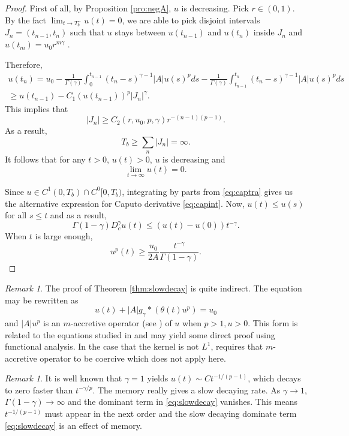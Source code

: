 \documentclass[12pt]{amsart}%
\theoremstyle{definition}
\theoremstyle{remark}
\newtheorem{rmk}[thm]{Remark}
\renewcommand{\ge}{\geqslant}
\renewcommand{\le}{\leqslant}
\begin{document}
\begin{proof}
First of all, by Proposition \ref{pro:negA}, $u$ is decreasing. Pick $r\in (0,1)$. 
 By the fact $\lim_{t\to T_b^-}u(t)=0$, we are able to pick disjoint intervals $J_n=(t_{n-1}, t_n)$ such that $u$ stays between $u(t_{n-1})$ and $u(t_n)$ inside $J_n$ and $u(t_m)=u_0r^{m\gamma}$ . 
 
Therefore, 
\begin{multline*}
u(t_n)=u_0-\frac{1}{\Gamma(\gamma)}\int_0^{t_{n-1}}(t_n-s)^{\gamma-1}|A|u(s)^pds-\frac{1}{\Gamma(\gamma)}\int_{t_{n-1}}^{t_n}
(t_n-s)^{\gamma-1}|A|u(s)^pds\\
\ge u(t_{n-1})-C_1(u(t_{n-1}))^p |J_n|^{\gamma}.
\end{multline*}
This implies that \[
|J_n|\ge C_2(r, u_0, p,\gamma) r^{-(n-1)(p-1)}.
\]
As a result, \[
T_b\ge \sum_{n} |J_n|=\infty.
\]
It follows that for any $t>0$, $u(t)>0$, $u$ is decreasing and \[
\lim_{t\to\infty}u(t)=0.
\]

Since $u\in C^1(0, T_b)\cap C^0[0, T_b)$,  integrating by parts from \eqref{eq:captra} gives us the alternative expression for Caputo derivative \eqref{eq:capint}. Now, $u(t)\le u(s)$ for all $s\le t$ and as a result,
 \[
\Gamma(1-\gamma)D_c^{\gamma}u(t) \le (u(t)-u(0))t^{-\gamma}.
\]
When $t$ is large enough,
\[
u^p(t)\ge \frac{u_0}{2A}\frac{t^{-\gamma}}{\Gamma(1-\gamma)}.
\]
\end{proof}

\begin{rmk}
The proof of Theorem \ref{thm:slowdecay} is quite indirect.  The equation may be rewritten as \[
u(t)+|A| g_{\gamma}*(\theta(t)u^p)=u_0
\]
and $|A|u^p$ is an $m$-accretive operator (see \cite{cn81}) of $u$ when $p>1, u>0$. This form is related to the equations studied in \cite{cn81} and may yield some direct proof using functional analysis. In the case that the kernel is not $L^1$, \cite{cn81} requires that $m$-accretive operator to be coercive which does not apply here. 
\end{rmk}

\begin{rmk}
It is well known that $\gamma=1$ yields $u(t)\sim Ct^{-1/(p-1)}$, which decays to zero faster than $t^{-\gamma/p}$. The memory really gives a slow decaying rate.  As $\gamma\to 1$, $\Gamma(1-\gamma)\to\infty$ and the dominant term in \eqref{eq:slowdecay} vanishes. This means $t^{-1/(p-1)}$ must appear in the next order and the slow decaying dominate term \eqref{eq:slowdecay} is an effect of memory. 
\end{rmk}
\end{document}
